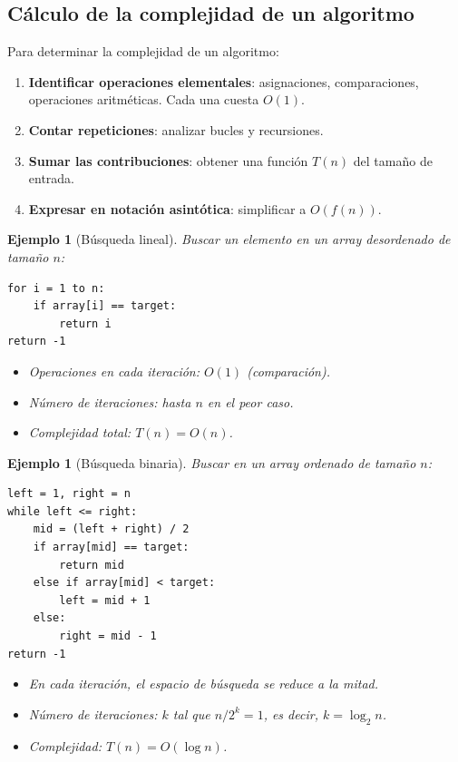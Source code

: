 \documentclass[a4paper,11pt]{report}
\newtheorem{example}[theorem]{Ejemplo}
\begin{document}
\subsection{Cálculo de la complejidad de un algoritmo}

Para determinar la complejidad de un algoritmo:

\begin{enumerate}
\item \textbf{Identificar operaciones elementales}: asignaciones, comparaciones, operaciones aritméticas. Cada una cuesta $O(1)$.
\item \textbf{Contar repeticiones}: analizar bucles y recursiones.
\item \textbf{Sumar las contribuciones}: obtener una función $T(n)$ del tamaño de entrada.
\item \textbf{Expresar en notación asintótica}: simplificar a $O(f(n))$.
\end{enumerate}

\begin{example}[Búsqueda lineal]
Buscar un elemento en un array desordenado de tamaño $n$:
\begin{verbatim}
for i = 1 to n:
    if array[i] == target:
        return i
return -1
\end{verbatim}
\begin{itemize}
\item Operaciones en cada iteración: $O(1)$ (comparación).
\item Número de iteraciones: hasta $n$ en el peor caso.
\item Complejidad total: $T(n) = O(n)$.
\end{itemize}
\end{example}

\begin{example}[Búsqueda binaria]
Buscar en un array ordenado de tamaño $n$:
\begin{verbatim}
left = 1, right = n
while left <= right:
    mid = (left + right) / 2
    if array[mid] == target:
        return mid
    else if array[mid] < target:
        left = mid + 1
    else:
        right = mid - 1
return -1
\end{verbatim}
\begin{itemize}
\item En cada iteración, el espacio de búsqueda se reduce a la mitad.
\item Número de iteraciones: $k$ tal que $n / 2^k = 1$, es decir, $k = \log_2 n$.
\item Complejidad: $T(n) = O(\log n)$.
\end{itemize}
\end{example}
\end{document}
